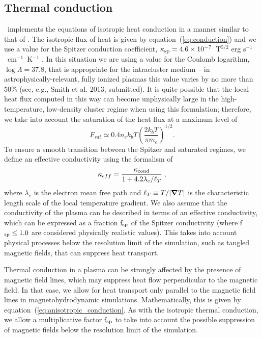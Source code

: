 \subsection{Thermal conduction}
\label{sec.num.conductions}

\enzo\ implements the equations of isotropic heat conduction in a manner
similar to that of \citet{2007ApJ...664..135P}.  
The isotropic flux of heat is given by equation~(\ref{eq:conduction}) and we
use a value for the Spitzer conduction coefficient, 
$\kappa_{\rm sp} = 4.6 \times 10^{-7}$~T$^{5/2}$ erg
s$^{-1}$~cm$^{-1}$~K$^{-1}$ \citep{1962pfig.book.....S}.  In this
situation we are using a
value for the Coulomb logarithm, $\log \Lambda = 37.8$, that is
appropriate for the intracluster medium \citep{1988xrec.book.....S} --
in astrophysically-relevant, fully ionized plasmas this value varies
by no more than 50\% (see, e.g., Smith et al. 2013, submitted).
It is quite possible that the local heat flux computed in this way 
can become unphysically large in
the high-temperature, low-density cluster regime when using this
formulation; therefore, we take into account the saturation of the heat
flux \citep{1977ApJ...211..135C} at a maximum level of
\begin{equation}
F_{sat} \simeq 0.4 n_e k_b T \left( \frac{2 k_b T}{\pi m_e} \right)^{1/2}.
\end{equation}
To ensure a smooth transition between
the Spitzer and saturated regimes, we define an effective
conductivity using the formalism of \citet{1988xrec.book.....S}
\begin{equation}
\kappa_{eff} = \frac{\kappa_{\rm cond}}{1 + 4.2 \lambda_e / \ell_T} \; ,
\end{equation}
where $\lambda_e$ is the electron mean free path and $\ell_T \equiv T
/ |\bm{\nabla} T|$ is the characteristic length scale of the local
temperature gradient.  We also assume that the conductivity of the
plasma can be described in terms of an effective conductivity, which
can be expressed as a fraction f$_{\rm sp}$ of the Spitzer conductivity
(where f$_{\rm sp} \leq 1.0$ are considered physically realistic values).  This takes
into account physical processes below the resolution limit of the
simulation, such as tangled magnetic fields, that can suppress heat
transport.

Thermal conduction in a plasma can be strongly affected by the
presence of magnetic field lines, which may suppress heat
flow perpendicular to the magnetic field.  In that case, we allow for
heat transport only parallel to the magnetic field lines in
magnetohydrodynamic simulations.  Mathematically, this is given
by equation~(\ref{eq:anisotropic_conduction}.
As with the isotropic thermal conduction, we allow a
multiplicative factor f$_{\rm sp}$ to take into account the possible
suppression of magnetic fields below the resolution limit of the
simulation.

